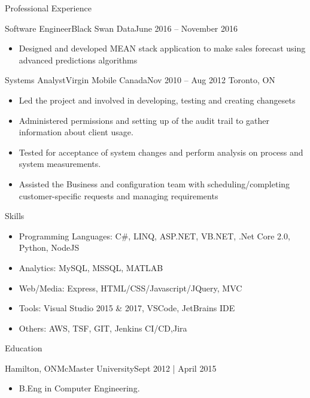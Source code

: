 \documentclass[]{mcdowellcv}
\begin{document}
\begin{cvsection}{Professional Experience}
\begin{cvsubsection}{Software Engineer}{Black Swan Data}{June 2016 -- November 2016}
\begin{itemize}
			\item Designed and developed MEAN stack application to make sales forecast using advanced predictions algorithms
		\end{itemize}
	\end{cvsubsection}
	\begin{cvsubsection}{Systems Analyst}{Virgin Mobile Canada}{Nov 2010 -- Aug 2012}
		Toronto, ON
		\begin{itemize}%
			\item Led the project and involved in developing, testing and creating changesets
			\item Administered permissions and setting up of the audit trail to gather information about client usage.
			\item Tested for acceptance of system changes and perform analysis on process and system measurements.
			\item Assisted the Business and configuration team with scheduling/completing customer-specific requests and managing requirements
		\end{itemize}
	\end{cvsubsection}
\end{cvsection}
\begin{cvsection}{Skills}
	\begin{cvsubsection}{}{}{}
		\begin{itemize}
			\item Programming Languages: C\#, LINQ, ASP.NET, VB.NET, .Net Core 2.0, Python, NodeJS
			\item Analytics: MySQL, MSSQL, MATLAB
			\item Web/Media: Express, HTML/CSS/Javascript/JQuery, MVC
			\item Tools: Visual Studio 2015 \& 2017, VSCode, JetBrains IDE
			\item Others: AWS, TSF, GIT, Jenkins CI/CD,Jira
		\end{itemize}
	\end{cvsubsection}
\end{cvsection}
\begin{cvsection}{Education}
	\begin{cvsubsection}{Hamilton, ON}{McMaster University}{Sept 2012 | April 2015}
		\begin{itemize}
			\item B.Eng in Computer Engineering.
		\end{itemize}
	\end{cvsubsection}
\end{cvsection}


\ 
\end{document}
